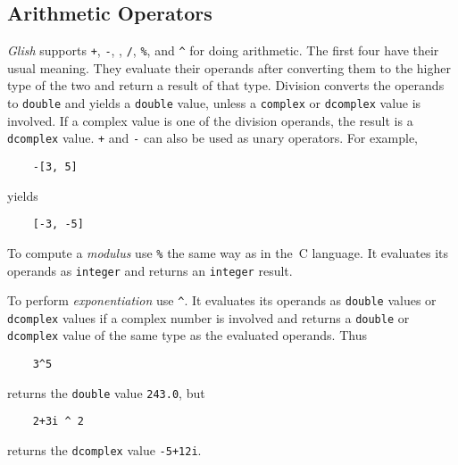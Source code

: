 \subsection{Arithmetic Operators}
\label{arith-operators}

{\em Glish} supports
{\tt +},
{\tt -},
{\tt *},
{\tt /},
{\tt \%},
and \verb+^+
for doing arithmetic.
The first four have their usual meaning.
They evaluate their operands after converting them
to the higher type of the two and return a result of that type.  Division
converts the operands to {\tt double} and yields a {\tt double} value, unless
a {\tt complex} or {\tt dcomplex} value is involved. If a complex value is one
of the division operands, the result is a {\tt dcomplex} value.
{\tt +}
and {\tt -}
can also be used as unary operators.  For example,
\begin{verbatim}
    -[3, 5]
\end{verbatim}
yields
\begin{verbatim}
    [-3, -5]
\end{verbatim}

To compute a {\em modulus} use {\tt \%} the same way as in
the~C language.  It evaluates its operands as {\tt integer} and returns
an {\tt integer} result.

To perform {\em exponentiation} use \verb+^+.  It evaluates its
operands as {\tt double} values or {\tt dcomplex} values if a complex
number is involved and returns a {\tt double} or {\tt dcomplex} value
of the same type as the evaluated operands. Thus
\begin{verbatim}
    3^5
\end{verbatim}
returns the {\tt double} value {\tt 243.0}, but
\begin{verbatim}
    2+3i ^ 2
\end{verbatim}
returns the {\tt dcomplex} value {\tt -5+12i}.

